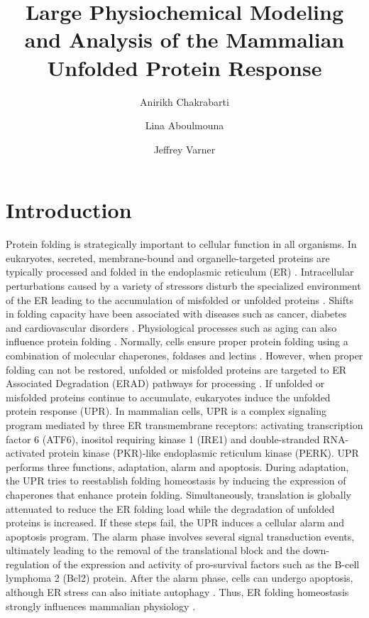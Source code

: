 \documentclass[fleqn,10pt]{wlscirep}
\title{Large Physiochemical Modeling and Analysis of the Mammalian Unfolded Protein Response}
\author[1]{Anirikh Chakrabarti}
\author[2]{Lina Aboulmouna}
\author[1,*]{Jeffrey Varner}
\affil[1]{Cornell University, School of Chemical and Biomolecular Engineering, Cornell University, Ithaca, NY 14853, USA}
\affil[2]{Purdue University, School of Chemical Engineering, West Lafayette, IN 47907, USA}
\affil[*]{jdv27@cornell.edu}
\begin{document}
\flushbottom
\maketitle

%
%
\thispagestyle{empty}



\section*{Introduction}

Protein folding is strategically important to cellular function in all organisms. In eukaryotes, secreted, membrane-bound and organelle-targeted proteins are typically processed and folded in the endoplasmic reticulum (ER) \cite{naidoo2009er, ron2002translational, kaufman2002unfolded}. Intracellular perturbations caused by a variety of stressors disturb the specialized environment of the ER leading to the accumulation of misfolded or unfolded proteins \cite{ellgaard2003qce,Fonseca:2009fk}. Shifts in folding capacity have been associated with diseases such as cancer, diabetes and cardiovascular disorders \cite{ellgaard2003qce}. Physiological processes such as aging can also influence protein folding \cite{naidoo2009er}. Normally, cells ensure proper protein folding using a combination of molecular chaperones, foldases and lectins \cite{naidoo2009er}. However, when proper folding can not be restored, unfolded or misfolded proteins are targeted to ER Associated Degradation (ERAD) pathways for processing \cite{kaufman2002unfolded}. If unfolded or misfolded proteins continue to accumulate, eukaryotes induce the unfolded protein response (UPR). In mammalian cells, UPR is a complex signaling program mediated by three ER transmembrane receptors: activating transcription factor 6 (ATF6), inositol requiring kinase 1 (IRE1) and double-stranded RNA-activated protein kinase (PKR)-like endoplasmic reticulum kinase (PERK). UPR performs three functions, adaptation, alarm and apoptosis. During adaptation, the UPR tries to reestablish folding homeostasis by inducing the expression of chaperones that enhance protein folding. Simultaneously, translation is globally attenuated to reduce the ER folding load while the degradation of unfolded proteins is increased. If these steps fail, the UPR induces a cellular alarm and apoptosis program. The alarm phase involves several signal transduction events, ultimately leading to the removal of the translational block and the down-regulation of the expression and activity of pro-survival factors such as the B-cell lymphoma 2 (Bcl2) protein. After the alarm phase, cells can undergo apoptosis, although ER stress can also initiate autophagy \cite{ogata2006aac, yorimitsu2006ers, bernales2006ace, kamimoto2006iic, hoyerhansen2007cmc, kouroku2006esp, fujita2007ter}. Thus, ER folding homeostasis strongly influences mammalian physiology \cite{Fonseca:2009fk}.
\end{document}
